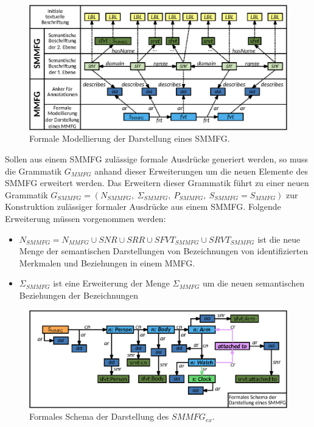 \begin{figure}[htb]
    \centering
    \includegraphics[width=\textwidth]{chapter/chapter_2/mmfg/semantic/formal-model-syntactic-smmfg.eps}
    \caption{Formale Modellierung der Darstellung eines SMMFG.}
    \label{sec2:sota:subsec:fz-explainablity:fig:mmfg-formal-model-smmfg}
\end{figure}
Sollen aus einem SMMFG zulässige formale Ausdrücke generiert werden, so muss die Grammatik $G_{MMFG}$ anhand dieser Erweiterungen um die neuen Elemente des SMMFG erweitert werden.
Das Erweitern dieser Grammatik führt zu einer neuen Grammatik $G_{SMMFG} = (N_{SMMFG},~\Sigma_{SMMFG},~P_{SMMFG},~S_{SMMFG}=S_{MMFG})$ zur Konstruktion zulässiger formaler Ausdrücke aus einem SMMFG.
Folgende Erweiterung müssen vorgenommen werden:
\begin{itemize}
    \item $N_{SMMFG} = N_{MMFG} \cup SNR \cup SRR \cup SFVT_{SMMFG} \cup SRVT_{SMMFG}$ ist die neue Menge der semantischen Darstellungen von Bezeichnungen von identifizierten Merkmalen und Beziehungen in einem MMFG.
    \item $\Sigma_{SMMFG}$ ist eine Erweiterung der Menge $\Sigma_{MMFG}$ um die neuen semantischen Beziehungen der Bezeichnungen
\end{itemize}

\begin{figure}[htb]
    \centering
    \includegraphics[width=\textwidth]{chapter/chapter_2/mmfg/semantic/formal-schema-smmfg-ex.eps}
    \caption{Formales Schema der Darstellung des $SMMFG_{ex}$.}
    \label{sec2:sota:subsec:fz-explainablity:fig:mmfg-formal-schema-smmfg}
\end{figure}

